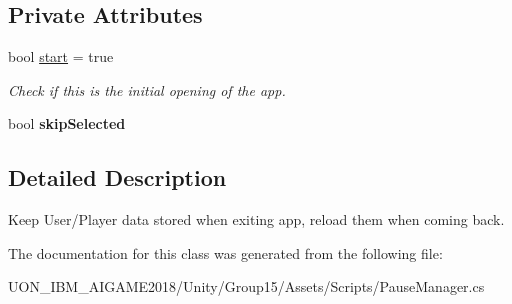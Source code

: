 \subsection*{Private Attributes}
\begin{DoxyCompactItemize}
\item 
\mbox{\label{class_pause_manager_a01e84a6aa94c2e746f047af9dcb5a04c}} 
bool \mbox{\hyperlink{class_pause_manager_a01e84a6aa94c2e746f047af9dcb5a04c}{start}} = true
\begin{DoxyCompactList}\small\item\em Check if this is the initial opening of the app. \end{DoxyCompactList}\item 
\mbox{\label{class_pause_manager_a2d11f4fd49f97bd8ede5f9e0afda9601}} 
bool {\bfseries skip\+Selected}
\end{DoxyCompactItemize}


\subsection{Detailed Description}
Keep User/\+Player data stored when exiting app, reload them when coming back. 

The documentation for this class was generated from the following file\+:\begin{DoxyCompactItemize}
\item 
U\+O\+N\+\_\+\+I\+B\+M\+\_\+\+A\+I\+G\+A\+M\+E2018/\+Unity/\+Group15/\+Assets/\+Scripts/Pause\+Manager.\+cs\end{DoxyCompactItemize}
